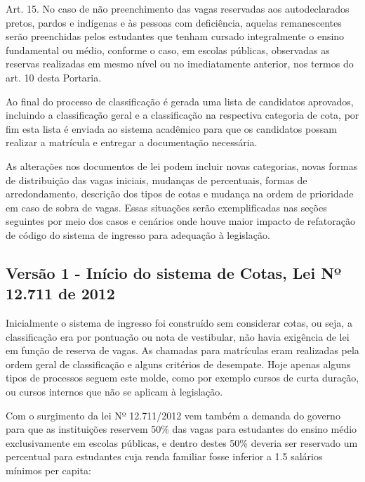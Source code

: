 \begin{citacao}
Art. 15. No caso de não preenchimento das vagas reservadas aos autodeclarados pretos, pardos
e indígenas e às pessoas com deficiência, aquelas remanescentes serão preenchidas pelos
estudantes que tenham cursado integralmente o ensino fundamental ou médio, conforme o caso,
em escolas públicas, observadas as reservas realizadas em mesmo nível ou no imediatamente
anterior, nos termos do art. 10 desta Portaria. \cite{portarianr9}
\end{citacao}

Ao final do processo de classificação é gerada uma lista de candidatos aprovados, incluindo a classificação geral e a classificação na respectiva categoria de cota, por fim esta lista é enviada ao sistema acadêmico para que os candidatos possam realizar a matrícula e entregar a documentação necessária. 

As alterações nos documentos de lei podem incluir novas categorias, novas formas de distribuição das vagas iniciais, mudanças de percentuais, formas de arredondamento, descrição dos tipos de cotas e mudança na ordem de prioridade em caso de sobra de vagas. Essas situações serão exemplificadas nas seções seguintes por meio dos casos e cenários onde houve maior impacto de refatoração de código do sistema de ingresso para adequação à legislação.


\subsection{Versão 1 - Início do sistema de Cotas, Lei Nº 12.711 de 2012}
\label{versao1}

Inicialmente o sistema de ingresso foi construído sem considerar cotas, ou seja, a classificação era por pontuação ou nota de vestibular, não havia exigência de lei em função de reserva de vagas. As chamadas para matrículas eram realizadas pela ordem geral de classificação e alguns critérios de desempate. Hoje apenas alguns tipos de processos seguem este molde, como por exemplo cursos de curta duração, ou cursos internos que não se aplicam à legislação.

Com o surgimento da lei Nº 12.711/2012 vem também a demanda do governo para que as instituições reservem 50\% das vagas para estudantes do ensino médio exclusivamente em escolas públicas, e dentro destes 50\% deveria ser reservado um percentual para estudantes cuja renda familiar fosse inferior a 1.5 salários mínimos per capita:

